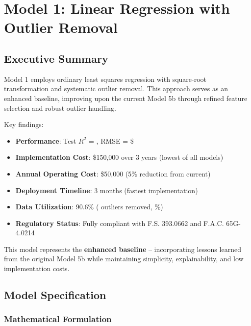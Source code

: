 \chapter{Model 1: Linear Regression with Outlier Removal}\label{ch:model1}



\section{Executive Summary}

Model 1 employs ordinary least squares regression with square-root transformation and systematic outlier removal. This approach serves as an enhanced baseline, improving upon the current Model 5b through refined feature selection and robust outlier handling.

Key findings:
\begin{itemize}
    \item \textbf{Performance}: Test $R^2$ = \ModelOneRSquaredTest{}, RMSE = \$\ModelOneRMSETest{}
    \item \textbf{Implementation Cost}: \$150,000 over 3 years (lowest of all models)
    \item \textbf{Annual Operating Cost}: \$50,000 (5\% reduction from current)
    \item \textbf{Deployment Timeline}: 3 months (fastest implementation)
    \item \textbf{Data Utilization}: 90.6\% (\ModelOneOutliersRemoved{} outliers removed, \ModelOneOutlierPercentage{}\%)
    \item \textbf{Regulatory Status}: Fully compliant with F.S. 393.0662 and F.A.C. 65G-4.0214
\end{itemize}

This model represents the \textbf{enhanced baseline} -- incorporating lessons learned from the original Model 5b while maintaining simplicity, explainability, and low implementation costs.

\section{Model Specification}

\subsection{Mathematical Formulation}


